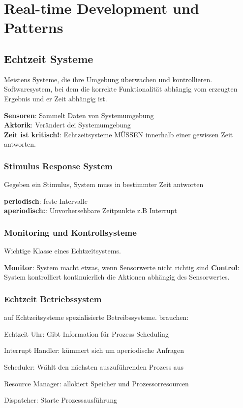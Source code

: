 \chapter{Real-time Development und Patterns}

\section{Echtzeit Systeme}
Meistens Systeme, die ihre Umgebung überwachen und kontrollieren.
Softwaresystem, bei dem die korrekte Funktionalität abhängig vom erzeugten Ergebnis und er
Zeit abhängig ist.

\textbf{Sensoren}: Sammelt Daten von Systemumgebung\\
\textbf{Aktorik}: Verändert dei Systemumgebung\\
\textbf{Zeit ist kritisch!}: Echtzeitsysteme MÜSSEN innerhalb einer gewissen Zeit antworten.

\subsection{Stimulus Response System}
Gegeben ein Stimulus, System muss in bestimmter Zeit antworten

\textbf{periodisch}: feste Intervalle\\
\textbf{aperiodisch:}: Unvorhersehbare Zeitpunkte z.B Interrupt

\subsection{Monitoring und Kontrollsysteme}
Wichtige Klasse eines Echtzeitsystems.

\textbf{Monitor}: System macht etwas, wenn Sensorwerte nicht richtig sind
\textbf{Control}: System kontrolliert kontinuierlich die Aktionen abhängig des Sensorwertes.

\subsection{Echtzeit Betriebssystem}
auf Echtzeitsysteme spezialisierte Betreibssysteme.
brauchen: \\
\begin{compactitem}
    \item Echtzeit Uhr: Gibt Information für Prozess Scheduling
    \item Interrupt Handler: kümmert sich um aperiodische Anfragen
    \item Scheduler: Wählt den nächsten auszuführenden Prozess aus
    \item Resource Manager: allokiert Speicher und Prozessorresourcen
    \item Dispatcher: Starte Prozessausführung
\end{compactitem}

